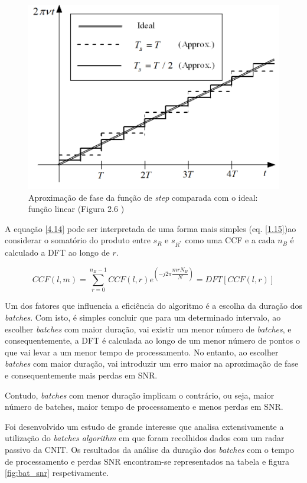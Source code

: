 \begin{figure}[h]
\centering
\includegraphics[scale=0.6]{chapters/ch4/assets/phase_ap}
\caption[Aproximação de fase]{Aproximação de fase da função de \textit{step} comparada com o ideal: função linear (Figura 2.6 \cite{Martorella})}
\label{fig:phase_ap}
\end{figure}

A equação \ref{4.14} pode ser interpretada de uma forma mais simples (eq. \ref{1.15})ao considerar o somatório do produto entre $s_{R}$ e $s_{R^{\ast}}$ como uma \gls{CCF} e a cada $n_{B}$ é calculado a \gls{DFT} ao longo de $r$.

\begin{equation} \label{4.15}
CCF\left( l,m\right)=\sum_{r=0}^{n_{B}-1}CCF\left( l,r\right) e^{\left( -j2\pi \dfrac{mrN_{B}}{N}\right)}=DFT\left[ CCF\left( l,r\right) \right] 
\end{equation}

Um dos fatores que influencia a eficiência do algoritmo é a escolha da duração dos \textit{batches}. Com isto, é simples concluir que para um determinado intervalo, ao escolher \textit{batches} com maior duração, vai existir um menor número de \textit{batches}, e consequentemente, a \gls{DFT} é calculada ao longo de um menor número de pontos o que vai levar a um menor tempo de processamento. No entanto, ao escolher \textit{batches} com maior duração, vai introduzir um erro maior na aproximação de fase e consequentemente mais perdas em \gls{SNR}.\par
Contudo, \textit{batches} com menor duração implicam o contrário, ou seja, maior número de batches, maior tempo de processamento e menos perdas em \gls{SNR}. \par 
Foi desenvolvido um estudo de grande interesse \parencite{Petri2012} que analisa extensivamente a utilização do \textit{batches algorithm} em que foram recolhidos dados com um radar passivo da \gls{CNIT}. Os resultados da análise da duração dos \textit{batches} com o tempo de processamento e perdas \gls{SNR} encontram-se representados na tabela e figura \ref{fig:bat_snr} respetivamente.\par 

